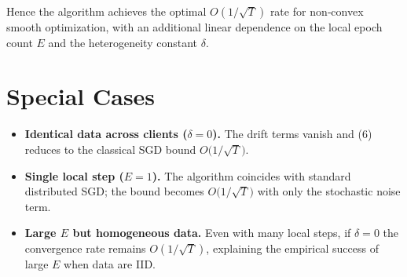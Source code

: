 \documentclass{article}
\begin{document}
Hence the algorithm achieves the optimal $O(1/\sqrt{T})$ rate for non‑convex
smooth optimization, with an additional linear dependence on the
local epoch count $E$ and the heterogeneity constant $\delta$.

\section*{Special Cases}
\begin{itemize}
\item \textbf{Identical data across clients ($\delta=0$).}  
      The drift terms vanish and (6) reduces to the classical SGD bound
      $O\bigl(1/\sqrt{T}\bigr)$.
\item \textbf{Single local step ($E=1$).}  
      The algorithm coincides with standard distributed SGD; the bound
      becomes $O\bigl(1/\sqrt{T}\bigr)$ with only the stochastic noise term.
\item \textbf{Large $E$ but homogeneous data.}  
      Even with many local steps, if $\delta=0$ the convergence rate
      remains $O(1/\sqrt{T})$, explaining the empirical success of large $E$
      when data are IID.
\end{itemize}

\end{document}
